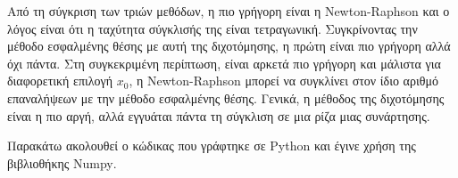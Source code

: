 \documentclass[assignment2.tex]{subfiles}
\begin{document}
Από τη σύγκριση των τριών μεθόδων, η πιο γρήγορη είναι η \textlatin{Newton-Raphson} και ο λόγος είναι ότι η ταχύτητα σύγκλισής της είναι τετραγωνική. Συγκρίνοντας την μέθοδο εσφαλμένης θέσης με αυτή της διχοτόμησης, η πρώτη είναι πιο γρήγορη αλλά όχι πάντα. Στη συγκεκριμένη περίπτωση, είναι αρκετά πιο γρήγορη και μάλιστα για διαφορετική επιλογή $x_0$, η \textlatin{Newton-Raphson} μπορεί να συγκλίνει στον ίδιο αριθμό επαναλήψεων με την μέθοδο εσφαλμένης θέσης. Γενικά, η μέθοδος της διχοτόμησης είναι η πιο αργή, αλλά εγγυάται πάντα τη σύγκλιση σε μια ρίζα μιας συνάρτησης.

Παρακάτω ακολουθεί ο κώδικας που γράφτηκε σε \textlatin{Python} και έγινε χρήση της βιβλιοθήκης \textlatin{Numpy}.

\end{document}
